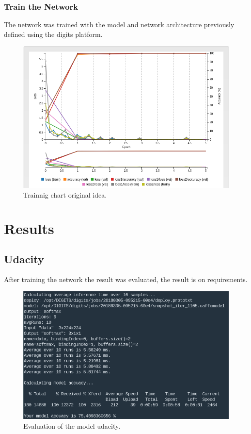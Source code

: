 \documentclass[10pt,journal,compsoc]{IEEEtran}
\begin{document}
\subsubsection{Train the Network}

The network was trained with the model and network architecture previously defined using the digits platform.

\begin{figure}[h]
\centering
\includegraphics[scale=0.25]{trainning-chart-udacity}
\caption{Trainnig chart original idea.}
\label{fig:figure3}
\end{figure}

\section{Results}

\subsection{Udacity}

After training the network the result was evaluated, the result is on requirements.

\begin{figure}[h]
\centering
\includegraphics[scale=0.2]{udacity-evaluate}
\caption{Evaluation of the model udacity.}
\label{fig:figure4}
\end{figure}
\end{document}
